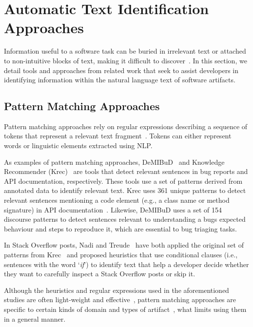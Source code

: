 \section{Automatic Text Identification Approaches}
\label{cp2:automatic-approaches}



Information useful to a software task can be buried in irrelevant text or attached to 
non-intuitive blocks of text, making it difficult to discover~\cite{Robillard2015}.
In this section, we detail tools and approaches from related work
that seek to assist developers in 
identifying information within the natural language
text of software artifacts.





\subsection{Pattern Matching Approaches}
\label{cp2:pattern-matching}


Pattern matching approaches rely on regular expressions describing a sequence of tokens that represent
 a relevant text fragment~\cite{Bavota2016}. Tokens can either represent words or linguistic elements 
extracted using \acf{NLP}.
    
    
As examples  of pattern matching approaches,  {\small DeMIBuD}~\cite{Chaparro2017}
 and Knowledge Recommender (Krec)~\cite{Maalej2013, Robillard2015} are tools that detect relevant sentences in bug reports and API documentation, respectively. 
These tools use a set of patterns derived from annotated data to identify relevant text. Krec  uses  361 unique patterns
to 
detect relevant sentences mentioning a 
code element (e.g., a class name or method signature) in API documentation~\cite{Robillard2015}.
Likewise, {\small DeMIBuD} uses a set of 154 discourse patterns to detect sentences 
relevant to understanding a bugs expected behaviour and steps to reproduce it,
which are essential to bug triaging tasks.




In Stack Overflow posts,
Nadi and Treude~\cite{nadi2020} have both applied the original set of patterns from Krec~\cite{Robillard2015} 
and proposed heuristics that use conditional clauses (i.e., sentences with the word `\textit{if}')
to identify text that help a developer 
decide whether they want to carefully inspect a Stack Overflow posts or skip it. 



Although the heuristics and regular expressions used in the aforementioned studies 
are often light-weight and effective~\cite{Bavota2016, Maalej2013}, 
pattern matching approaches are specific to certain kinds of domain and 
types of artifact~\cite{fucci2019}, what limits
using them in a general manner.





